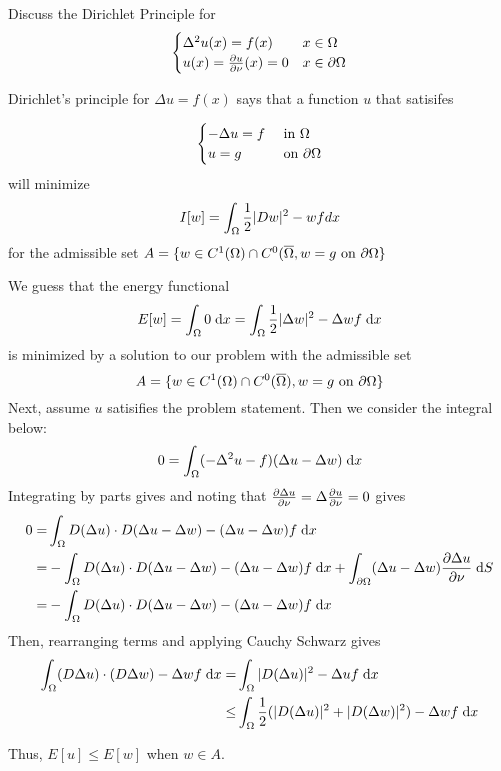 Discuss the Dirichlet Principle for
$$
\begin{cases}
  \Delta^2 u(x) = f(x) & x \in \Omega\\
  u(x) = \frac{\partial u}{\partial \nu}(x) = 0 & x \in \partial \Omega
\end{cases}
$$

Dirichlet's principle for $\Delta u = f(x)$ says that a function $u$ that satisifes

$$
\begin{cases}
  -\Delta u = f & \text{ in } \Omega\\
  u = g & \text{ on } \partial \Omega
\end{cases}
$$
will minimize
$$
I[w] = \int_\Omega \frac{1}{2} |D w|^2 - w f dx
$$
for the admissible set $A = \{ w \in C^1(\Omega) \cap C^0(\overline{\Omega}, w = g \text{ on } \partial \Omega \}$



We guess that the energy functional
$$
E[w] = \int_\Omega 0 \;\mathrm{d}x = \int_\Omega \frac{1}{2} |\Delta w|^2 - \Delta w f \;\mathrm{d}x
$$
is minimized by a solution to our problem with the admissible set
$$
A = \{ w \in C^1(\Omega) \cap C^0(\overline{\Omega}), w = g \text{ on } \partial \Omega \}
$$
Next, assume $u$ satisifies the problem statement.
Then we consider the integral below:
\begin{align*}
0 = \int_\Omega (-\Delta^2 u - f) (\Delta u - \Delta w) \;\mathrm{d}x
\end{align*}
Integrating by parts gives and noting that $\frac{\partial \Delta u}{\partial \nu} = \Delta \frac{\partial u}{\partial \nu} = 0$ gives
\begin{align*}
  0 = &\int_\Omega D (\Delta u) \cdot D (\Delta u - \Delta w) - (\Delta u - \Delta w) f \;\mathrm{d}x\\
    = &-\int_\Omega D(\Delta u) \cdot D (\Delta u - \Delta w) - (\Delta u - \Delta w) f \;\mathrm{d}x
        + \int_{\partial \Omega} (\Delta u - \Delta w) \frac{\partial \Delta u}{\partial \nu} \;\mathrm{d}S\\
    = &-\int_\Omega D(\Delta u) \cdot D (\Delta u - \Delta w) - (\Delta u - \Delta w) f \;\mathrm{d}x
\end{align*}
Then, rearranging terms and applying Cauchy Schwarz gives
\begin{align*}
   \int_\Omega (D \Delta u) \cdot (D \Delta w) - \Delta w f \;\mathrm{d}x = &\int_\Omega |D(\Delta u)|^2 - \Delta u f \;\mathrm{d}x\\
     \leq &\int_\Omega \frac{1}{2} (|D(\Delta u)|^2 + |D(\Delta w)|^2) - \Delta w f \;\mathrm{d}x
\end{align*}

Thus, $E[u] \leq E[w]$ when $w \in A$.
